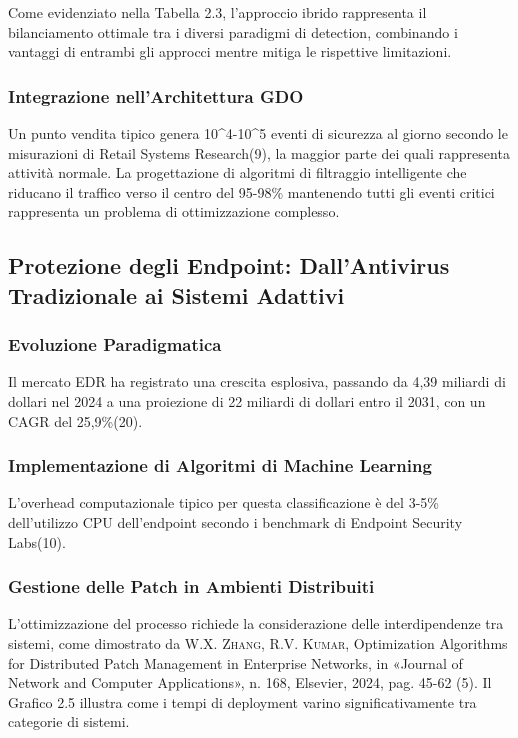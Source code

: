 \documentclass[12pt,a4paper,oneside]{book}
\newcommand{\autore}[1]{\textsc{#1}}
\newcommand{\citarticolo}[7]{%
    \autore{#1}, #2, in «#3», n. #4, #5, #6, pag. #7%
}
\begin{document}
Come evidenziato nella Tabella 2.3, l'approccio ibrido rappresenta il bilanciamento ottimale tra i diversi paradigmi di detection, combinando i vantaggi di entrambi gli approcci mentre mitiga le rispettive limitazioni.

\subsubsection{Integrazione nell'Architettura GDO}

Un punto vendita tipico genera 10^4-10^5 eventi di sicurezza al giorno secondo le misurazioni di Retail Systems Research(9), la maggior parte dei quali rappresenta attività normale. La progettazione di algoritmi di filtraggio intelligente che riducano il traffico verso il centro del 95-98\% mantenendo tutti gli eventi critici rappresenta un problema di ottimizzazione complesso.

\subsection{Protezione degli Endpoint: Dall'Antivirus Tradizionale ai Sistemi Adattivi}

\subsubsection{Evoluzione Paradigmatica}

Il mercato EDR ha registrato una crescita esplosiva, passando da 4,39 miliardi di dollari nel 2024 a una proiezione di 22 miliardi di dollari entro il 2031, con un CAGR del 25,9\%(20).

\subsubsection{Implementazione di Algoritmi di Machine Learning}

L'overhead computazionale tipico per questa classificazione è del 3-5\% dell'utilizzo CPU dell'endpoint secondo i benchmark di Endpoint Security Labs(10).

\subsubsection{Gestione delle Patch in Ambienti Distribuiti}

L'ottimizzazione del processo richiede la considerazione delle interdipendenze tra sistemi, come dimostrato da \citarticolo{W.X. Zhang, R.V. Kumar}{Optimization Algorithms for Distributed Patch Management in Enterprise Networks}{Journal of Network and Computer Applications}{168}{Elsevier}{2024}{45-62}(5). Il Grafico 2.5 illustra come i tempi di deployment varino significativamente tra categorie di sistemi.
\end{document}
